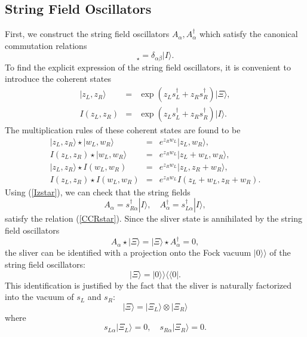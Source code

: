\documentclass[a4paper,12pt]{article}
\def\cob{\delta}
\def\ket{\rangle}
\def\bt{\beta}
\def\al{\alpha}
\def\tens{\otimes}
\def\dag{\dagger}
\def\st{\star}
\def\sd{s^{\dagger}}
\newcommand{\kket}{\rangle\rangle}
\newcommand{\bbra}{\langle\langle}
\begin{document}
\subsection{String Field Oscillators}
First, we construct the string field oscillators 
$A_{\al},A^{\dag}_{\al}$
\cite{KawanoOkuyama} which satisfy the canonical commutation relations
\begin{equation}
 [A_{\al},A^{\dag}_{\bt}]_{\st}=\cob_{\al\bt}|I\ket.
\label{CCRstar}
\end{equation}
To find the explicit expression of the string field oscillators, 
it is convenient to introduce the coherent states
\begin{eqnarray}
 |z_L,z_R\ket&=&\exp(z_L\sd_L+z_R\sd_R)|\Xi\ket, \\
 I(z_L,z_R)&=& \exp(z_L\sd_L+z_R\sd_R)|I\ket.
\end{eqnarray}
The multiplication rules of these coherent states are found to be
\begin{eqnarray}
 |z_L,z_R\ket\st|w_L,w_R\ket&=&e^{z_Rw_L}|z_L,w_R\ket, \\
 I(z_L,z_R)\st |w_L,w_R\ket&=&e^{z_Rw_L}|z_L+w_L,w_R\ket, 
\label{Icoh}\\
 |z_L,z_R\ket\st I(w_L,w_R)&=&e^{z_Rw_L}|z_L,z_R+w_R\ket, 
\label{cohI}\\
 I(z_L,z_R)\st I(w_L,w_R)&=&e^{z_Rw_L}I(z_L+w_L,z_R+w_R).
\label{Izstar}
\end{eqnarray}
Using (\ref{Izstar}), we can check that the string fields
\begin{equation}
A_{\al}=\sd_{R\al}|I\ket,\quad A^{\dag}_{\al}=\sd_{L\al}|I\ket,
\label{strosci}
\end{equation}
satisfy the relation (\ref{CCRstar}).
Since the sliver state is annihilated by the string field oscillators
\begin{equation}
 A_{\al}\st|\Xi\ket=|\Xi\ket\st A^{\dag}_{\al}=0,
\end{equation}
the sliver can be identified with a projection onto the Fock vacuum 
$|0\kket$ of the string field oscillators:
\begin{equation}
 |\Xi\ket=|0\kket\bbra 0|.
\end{equation}
This identification is justified by the fact that the sliver
is naturally factorized into the vacuum of $s_L$ and $s_R$: 
\begin{equation}
 |\Xi\ket=|\Xi_L\ket\tens|\Xi_R\ket
\end{equation}
where
\begin{equation}
 s_{L\al}|\Xi_L\ket=0, \quad s_{R\al}|\Xi_R\ket=0.
\end{equation}
\end{document}
